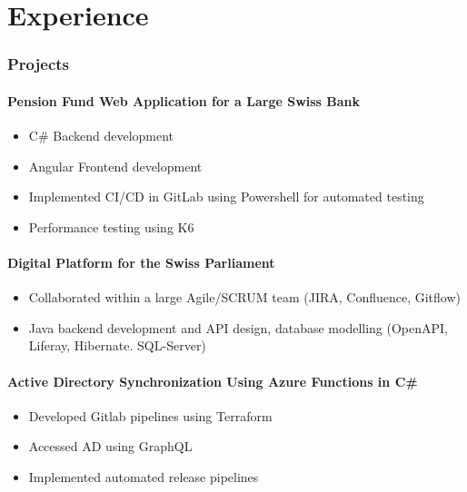 \section{Experience}
\subsubsection*{Projects}
\paragraph{Pension Fund Web Application for a Large Swiss Bank}
\begin{itemize}
    \item C\# Backend development
    \item Angular Frontend development
    \item Implemented CI/CD in GitLab using Powershell for automated testing
    \item Performance testing using K6
\end{itemize}
\paragraph{Digital Platform for the Swiss Parliament}
\begin{itemize}
    \item Collaborated within a large Agile/SCRUM team (JIRA, Confluence, Gitflow)
    \item Java backend development and API design, database modelling (OpenAPI, Liferay, Hibernate. SQL-Server)
\end{itemize}
\paragraph{Active Directory Synchronization Using Azure Functions in C\#}
\begin{itemize}
    \item Developed Gitlab pipelines using Terraform
    \item Accessed AD using GraphQL
    \item Implemented automated release pipelines
\end{itemize}
\vspace{1.25em}
\dottedline
{}
\vspace{-1em}
